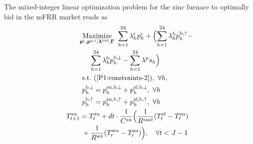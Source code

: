\documentclass[conference]{IEEEtran}
\begin{document}
\begingroup
\allowdisplaybreaks
The mixed-integer linear optimization problem for the zinc furnace to optimally bid in the mFRR market reads as
%
\begin{subequations}\label{P2:FinalModel}
    \begin{align}
           & \underset{\bm{p}^{\rm{r}}, \bm{p}^{q,\rm{r}}, \bm{\lambda}^{\rm{bid}}, \bm{\Gamma}}{\text{Maximize}} \ \sum_{h=1}^{24}\lambda_{h}^{\rm{r}} p^{\rm{r}}_{h}+ \Bigl(\sum_{h=1}^{24}  \lambda_{h}^{\rm{b}} p^{\rm{b},\uparrow}_{h} - \notag                                                                                                                                                                                                                                                            \\  &  \hspace{0.5cm}\sum_{h=1}^{24}  \lambda_{h}^{\rm{b}} p^{\rm{b},\downarrow}_{h} - \sum_{h=1}^{24}  \lambda^{\rm{p}}s_{h} \Bigr) \label{P2:1} \\
           & \   \text{s.t.}  \  (\ref{P1:constraints-2}), \ \forall{h},   \label{P2:2}                                                                                                                                                                                                                                                                                                                                                                                                                                                           \\
           & \ p^{\rm{b},\downarrow}_{h} = p^{\rm{zu}, \rm{b},\downarrow}_{h} + p^{\rm{zl}, \rm{b},\downarrow}_{h}, \ \forall{h} \label{P2:3} \\
           & \ p^{\rm{b},\uparrow}_{h} = p^{\rm{zu}, \rm{b},\uparrow}_{h} + p^{\rm{zl}, \rm{b},\uparrow}_{h}, \ \forall{h} \label{P2:33} \\
        T^{\text{zu}}_{t+1} & = T^{\text{zu}}_{t} + dt \cdot \frac{1}{C^{\text{zu}}}\Bigl( \frac{1}{R^{\text{zuzl}}} (T^{\text{zl}}_{t} - T^{\text{zu}}_{t}) \notag                                     \\ & \mspace{5mu} + \frac{1}{R^{\text{wz}}} (T^{\text{wu}}_{t} - T^{\text{zu}}_{t}) \Bigr), \quad \forall{t} < J-1 \label{P2:StateSpace1} \\

\end{align}
\end{subequations}
\end{document}
